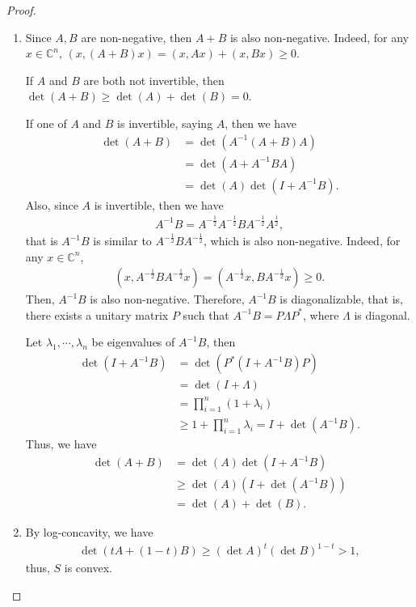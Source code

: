 \documentclass[11pt]{article}
\theoremstyle{definition}
\numberwithin{equation}{subsection}
\begin{document}
\begin{proof}
~\begin{enumerate}[label=(\alph*)]
    \item Since $A, B$ are non-negative, then $A + B$ is also non-negative. Indeed, for any $x \in \mathbb{C}^n$, $(x, (A+B)x) = (x, Ax) + (x, Bx) \geq 0$.
    
    If $A$ and $B$ are both not invertible, then $\det(A+B) \geq \det(A) + \det(B) = 0$.
    
    If one of $A$ and $B$ is invertible, saying $A$, then we have
    \begin{align*}
        \det(A + B) & = \det \left(A^{-1} (A + B) A \right) \\
        & = \det \left(A + A^{-1} BA \right) \\
        & = \det (A) \det \left(I + A^{-1} B\right).
    \end{align*}
    Also, since $A$ is invertible, then we have
    \begin{align*}
        A^{-1} B = A^{-\frac{1}{2}} A^{-\frac{1}{2}} B A^{-\frac{1}{2}} A^{\frac{1}{2}},
    \end{align*}
    that is $A^{-1} B$ is similar to $A^{-\frac{1}{2}} B A^{-\frac{1}{2}}$, which is also non-negative. Indeed, for any $x \in \mathbb{C}^n$, 
    \begin{align*}
        \left(x, A^{-\frac{1}{2}} B A^{-\frac{1}{2}} x\right) = \left(A^{-\frac{1}{2}} x, B A^{-\frac{1}{2}} x\right) \geq 0.
    \end{align*}
    Then, $A^{-1} B$ is also non-negative. Therefore, $A^{-1} B$ is diagonalizable, that is, there exists a unitary matrix $P$ such that $A^{-1}B = P \Lambda P^*$, where $\Lambda$ is diagonal.
    
    Let $\lambda_1, \cdots, \lambda_n$ be eigenvalues of $A^{-1} B$, then 
    \begin{align*}
        \det \left(I + A^{-1} B\right) & = \det \left(P^* \left(I + A^{-1} B\right) P \right) \\
        & = \det \left(I + \Lambda \right) \\
        & = \prod^n_{i=1} (1 + \lambda_i) \\
        & \geq 1 + \prod^n_{i=1} \lambda_i = I + \det \left(A^{-1} B\right).
    \end{align*}
    Thus, we have
    \begin{align*}
        \det(A + B) & = \det (A) \det \left(I + A^{-1} B\right) \\
        & \geq \det (A) \left(I + \det \left(A^{-1} B\right) \right) \\
        & = \det(A) + \det(B).
    \end{align*}
    
    \item By log-concavity, we have
    \begin{align*}
        \det (tA + (1-t)B) \geq (\det A)^t (\det B)^{1-t} > 1,
    \end{align*}
    thus, $S$ is convex.
\end{enumerate}
\end{proof}
\end{document}
